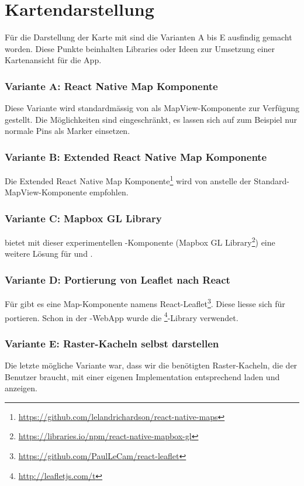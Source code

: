 \section{Kartendarstellung}
\label{tb-evaluation-karte}
Für die Darstellung der Karte mit  sind die Varianten A bis E ausfindig gemacht worden. 
Diese Punkte beinhalten Libraries oder Ideen zur Umsetzung einer Kartenansicht für die App. 


\subsubsection{Variante A: React Native Map Komponente}
Diese Variante wird standardmässig von  als MapView-Komponente zur Verfügung gestellt. 
Die Möglichkeiten sind eingeschränkt, es lassen sich auf  zum Beispiel nur normale Pins als Marker einsetzen.\cite{react-native-mapview-pin}


\subsubsection{Variante B: Extended React Native Map Komponente}
Die Extended React Native Map Komponente\footnote{\url{https://github.com/lelandrichardson/react-native-maps}} wird von  anstelle der Standard-MapView-Komponente empfohlen.


\subsubsection{Variante C: Mapbox GL Library}
 bietet mit dieser experimentellen -Komponente (Mapbox GL Library\footnote{\url{https://libraries.io/npm/react-native-mapbox-gl}}) eine weitere Lösung für  und .


\subsubsection{Variante D: Portierung von Leaflet nach React}
Für  gibt es eine Map-Komponente namens React-Leaflet\footnote{\url{https://github.com/PaulLeCam/react-leaflet}}. 
Diese liesse sich für  portieren.
Schon in der \kort{}-\gls{WebApp} wurde die \footnote{\url{http://leafletjs.com/t}}-Library verwendet.


\subsubsection{Variante E: Raster-Kacheln selbst darstellen}
Die letzte mögliche Variante war, dass wir die benötigten Raster-Kacheln, die der Benutzer braucht, mit einer eigenen Implementation entsprechend laden und anzeigen.

